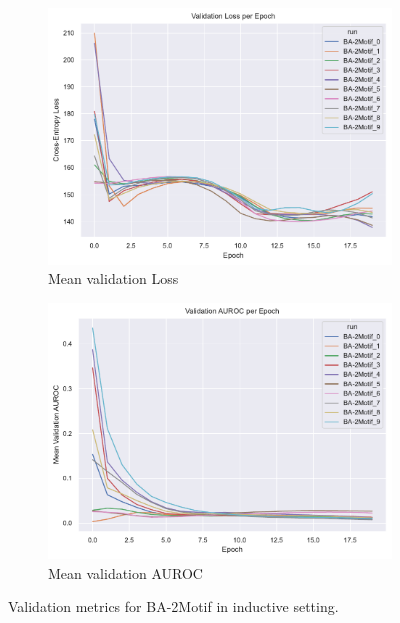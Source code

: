 \begin{figure}[htbp]
    \centering
    \begin{subfigure}[b]{0.48\textwidth}
        \centering
        \includegraphics[width=\textwidth]{img/plots/2M_val_loss_plot.pdf}
        \caption{Mean validation Loss}
        \label{fig:BA-2Motif-val_loss}
    \end{subfigure}
    \hfill
    \begin{subfigure}[b]{0.48\textwidth}
        \centering
        \includegraphics[width=\textwidth]{img/plots/2M_val_auroc_plot.pdf}
        \caption{Mean validation AUROC}
        \label{fig:BA-2Motif-val_auroc}
    \end{subfigure}
    \caption[Validation metrics for BA-2Motif]{Validation metrics for BA-2Motif in inductive setting.}
    \label{fig:BA-2Motif-val_metrics}
\end{figure}

